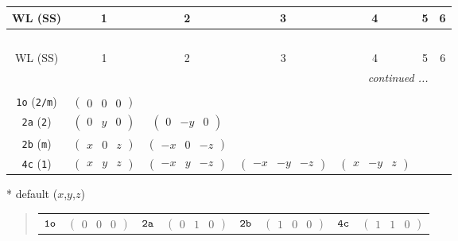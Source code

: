 \documentclass[fleqn,9pt,landscape]{jsarticle}
\begin{document}
\begin{center}
\renewcommand{\arraystretch}{1.2}
\begin{longtable}{ccccccc}
 \hline \hline
WL (SS) & 1 & 2 & 3 & 4 & 5 & 6 \\ \hline \endfirsthead

\multicolumn{6}{l}{\tablename\ \thetable{}} \\
 \hline \hline
WL (SS) & 1 & 2 & 3 & 4 & 5 & 6 \\ \hline \endhead

 \hline \hline
\multicolumn{6}{r}{\footnotesize\it continued ...} \\ \endfoot

 \hline \hline
\multicolumn{6}{r}{} \\ \endlastfoot

{\tt 1o} ({\tt 2/m}) & $ \begin{pmatrix} 0 & 0 & 0 \end{pmatrix} $ & $  $ & $  $ & $  $ \\ \hline
{\tt 2a} ({\tt 2}) & $ \begin{pmatrix} 0 & y & 0 \end{pmatrix} $ & $ \begin{pmatrix} 0 & - y & 0 \end{pmatrix} $ & $  $ & $  $ \\ \hline
{\tt 2b} ({\tt m}) & $ \begin{pmatrix} x & 0 & z \end{pmatrix} $ & $ \begin{pmatrix} - x & 0 & - z \end{pmatrix} $ & $  $ & $  $ \\ \hline
{\tt 4c} ({\tt 1}) & $ \begin{pmatrix} x & y & z \end{pmatrix} $ & $ \begin{pmatrix} - x & y & - z \end{pmatrix} $ & $ \begin{pmatrix} - x & - y & - z \end{pmatrix} $ & $ \begin{pmatrix} x & - y & z \end{pmatrix} $ \\
\end{longtable}
\end{center}
* default ($x$,$y$,$z$)
\begin{quote}
\begin{tabular}{cccccccc}
$ {\tt 1o} $ & $ \begin{pmatrix} 0 & 0 & 0 \end{pmatrix} $ & $ {\tt 2a} $ & $ \begin{pmatrix} 0 & 1 & 0 \end{pmatrix} $ & $ {\tt 2b} $ & $ \begin{pmatrix} 1 & 0 & 0 \end{pmatrix} $ & $ {\tt 4c} $ & $ \begin{pmatrix} 1 & 1 & 0 \end{pmatrix} $
\end{tabular}
\end{quote}
\end{document}
